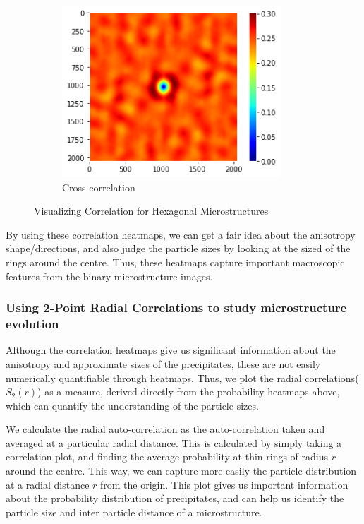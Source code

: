 \documentclass[12pt, a4paper]{report}
\begin{document}
\begin{figure}[H]
\begin{subfigure}{.32\textwidth}
  \centering
  \includegraphics[width=0.9\textwidth]{Pictures/MSFeatures/CorrHexaCross.png}
  \caption{Cross-correlation}
  \label{img:microstrImg}
\end{subfigure}
\caption{Visualizing Correlation for Hexagonal Microstructures}
\label{fig:test}
\end{figure}
By using these correlation heatmaps, we can get a fair idea about the anisotropy shape/directions, and also judge the particle sizes by looking at the sized of the rings around the centre. Thus, these heatmaps capture important macroscopic features from the binary microstructure images. 


\subsubsection{Using 2-Point Radial Correlations to study microstructure evolution}
\label{radialCorrelationDerivation}

Although the correlation heatmaps give us significant information about the anisotropy and approximate sizes of the precipitates, these are not easily numerically quantifiable through heatmaps. Thus, we plot the radial correlations($S_2(r)$) as a measure, derived directly from the probability heatmaps above, which can quantify the understanding of the particle sizes. 

We calculate the radial auto-correlation as the auto-correlation taken and averaged at a particular radial distance. This is calculated by simply taking a correlation plot, and finding the average probability at thin rings of radius $r$ around the centre. This way, we can capture more easily the particle distribution at a radial distance $r$ from the origin. This plot gives us important information about the probability distribution of precipitates, and can help us identify the particle size and inter particle distance of a microstructure. 
\end{document}
